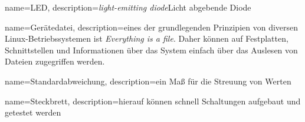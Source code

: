 {
  name=LED,
  description={\emph{light-emitting diode}\newline Licht abgebende Diode}
}

{
  name=Gerätedatei,
  description={eines der grundlegenden Prinzipien von diversen Linux-Betriebssystemen ist \emph{Everything is a file}.\newline
  Daher können auf Festplatten, Schnittstellen und Informationen über das System einfach über das Auslesen von Dateien zugegriffen werden.
  }
}

{
  name=Standardabweichung,
  description={ein Maß für die Streuung von Werten}
}

{
  name=Steckbrett,
  description={hierauf können schnell Schaltungen aufgebaut und getestet werden}
}